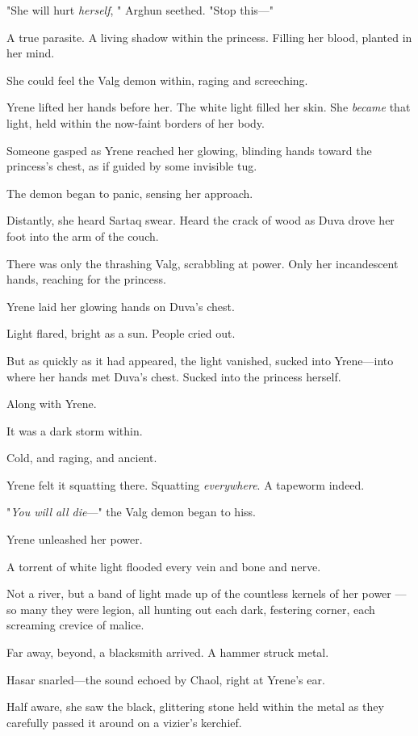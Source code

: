 "She will hurt \emph{herself}, " Arghun seethed. "Stop this---"

A true parasite. A living shadow within the princess. Filling her blood, planted in her mind.

She could feel the Valg demon within, raging and screeching.

Yrene lifted her hands before her. The white light filled her skin. She
\emph{became} that light, held within the now-faint borders of her body.

Someone gasped as Yrene reached her glowing, blinding hands toward the princess's chest, as if guided by some invisible tug.

The demon began to panic, sensing her approach.

Distantly, she heard Sartaq swear. Heard the crack of wood as Duva drove her foot into the arm of the couch.

There was only the thrashing Valg, scrabbling at power. Only her incandescent hands, reaching for the princess.

Yrene laid her glowing hands on Duva's chest.

Light flared, bright as a sun. People cried out.

But as quickly as it had appeared, the light vanished, sucked into Yrene---into where her hands met Duva's chest. Sucked into the princess herself.

Along with Yrene.

It was a dark storm within.

Cold, and raging, and ancient.

Yrene felt it squatting there. Squatting \emph{everywhere}. A tapeworm indeed.

"\emph{You will all die}---" the Valg demon began to hiss.

Yrene unleashed her power.

A torrent of white light flooded every vein and bone and nerve.

Not a river, but a band of light made up of the countless kernels of her power ---so many they were legion, all hunting out each dark, festering corner, each screaming crevice of malice.

Far away, beyond, a blacksmith arrived. A hammer struck metal.

Hasar snarled---the sound echoed by Chaol, right at Yrene's ear.

Half aware, she saw the black, glittering stone held within the metal as they carefully passed it around on a vizier's kerchief.

